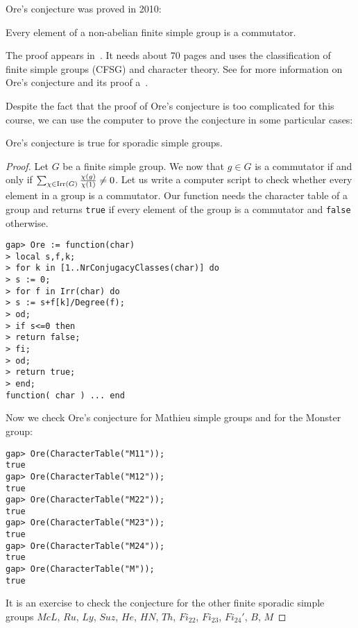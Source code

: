 Ore's conjecture was proved in 2010:

\begin{theorem}
    Every element of a non-abelian finite simple group is a commutator.     
\end{theorem}

The proof appears in~\cite{MR2654085}. It needs about 70 pages and
uses the classification of finite simple groups (CFSG) and character theory.
See \cite{MR3289286} for more information on Ore's conjecture and its proof 
a~\cite{MR3289286}. 

Despite the fact that the proof of Ore's conjecture is too complicated for 
this course, we can use the computer to 
prove the conjecture in some particular cases:

\begin{proposition}
    Ore's conjecture is true 
    for sporadic simple groups.
\end{proposition}

\begin{proof}
    Let $G$ be a finite simple group. 
    We now that $g\in G$ is a commutator if and only if 
    $\sum_{\chi\in\operatorname{Irr}(G)}\frac{\chi(g)}{\chi(1)}\ne 0$. Let us write
    a computer script to check whether every element in a group 
    is a commutator. Our
    function needs the character table of a group and returns 
    \lstinline{true} if every element of the group is a commutator and
    \lstinline{false} otherwise. 
\begin{lstlisting}
gap> Ore := function(char) 
> local s,f,k;
> for k in [1..NrConjugacyClasses(char)] do
> s := 0;
> for f in Irr(char) do
> s := s+f[k]/Degree(f);  
> od;
> if s<=0 then
> return false;
> fi;
> od;
> return true;
> end;
function( char ) ... end
\end{lstlisting}
Now we check Ore's conjecture for Mathieu simple groups
and for the Monster group: 
\begin{lstlisting}
gap> Ore(CharacterTable("M11"));
true
gap> Ore(CharacterTable("M12"));
true
gap> Ore(CharacterTable("M22"));
true
gap> Ore(CharacterTable("M23"));
true
gap> Ore(CharacterTable("M24"));
true
gap> Ore(CharacterTable("M"));
true
\end{lstlisting}
It is an exercise to check the conjecture for the other finite sporadic 
simple groups $McL$, $Ru$, $Ly$, $Suz$, $He$, $HN$, $Th$, $Fi_{22}$, $Fi_{23}$, $Fi_{24}'$, $B$, $M$ 
\end{proof}

